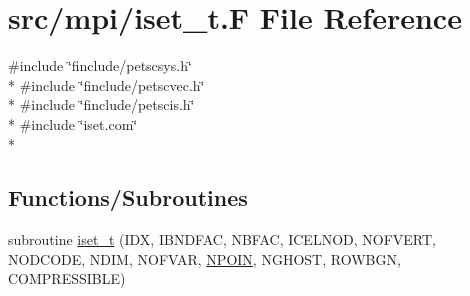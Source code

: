 \hypertarget{mpi_2iset__t_8_f}{\section{src/mpi/iset\-\_\-t.F File Reference}
\label{mpi_2iset__t_8_f}
}
{\ttfamily \#include \char`\"{}finclude/petscsys.\-h\char`\"{}}\\*
{\ttfamily \#include \char`\"{}finclude/petscvec.\-h\char`\"{}}\\*
{\ttfamily \#include \char`\"{}finclude/petscis.\-h\char`\"{}}\\*
{\ttfamily \#include \char`\"{}iset.\-com\char`\"{}}\\*
\subsection*{Functions/\-Subroutines}
\begin{DoxyCompactItemize}
\item 
subroutine \hyperlink{mpi_2iset__t_8_f_a9d076ef4de2b9363a90ded67fb56769e}{iset\-\_\-t} (I\-D\-X, I\-B\-N\-D\-F\-A\-C, N\-B\-F\-A\-C, I\-C\-E\-L\-N\-O\-D, N\-O\-F\-V\-E\-R\-T, N\-O\-D\-C\-O\-D\-E, N\-D\-I\-M, N\-O\-F\-V\-A\-R, \hyperlink{mesh_8com_ae28c1572321efcd8715b974d87d20c58}{N\-P\-O\-I\-N}, N\-G\-H\-O\-S\-T, R\-O\-W\-B\-G\-N, C\-O\-M\-P\-R\-E\-S\-S\-I\-B\-L\-E)
\end{DoxyCompactItemize}


